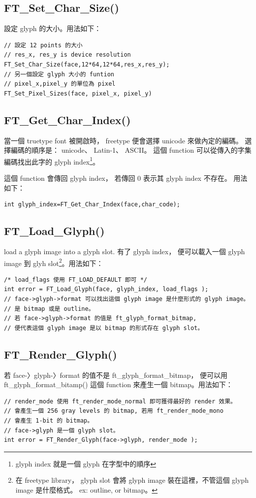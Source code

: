 \documentclass[12pt,a4]{article}
\begin{document}
\begin{CJK}{UTF8}{bsmi}
\subsection{FT\_{}Set\_{}Char\_{}Size()}
設定 glyph 的大小。用法如下：
\begin{Verbatim}[commandchars=@\[\]]
// 設定 12 points 的大小
// res_x, res_y is device resolution
FT_Set_Char_Size(face,12*64,12*64,res_x,res_y);
// 另一個設定 glyph 大小的 funtion
// pixel_x,pixel_y 的單位為 pixel
FT_Set_Pixel_Sizes(face, pixel_x, pixel_y)
\end{Verbatim}
\subsection{FT\_{}Get\_{}Char\_{}Index()}
當一個 truetype font 被開啟時， freetype 便會選擇 unicode 來做內定的編碼。
選擇編碼的順序是： unicode、 Latin-1、 ASCII。
這個 function 可以從傳入的字集編碼找出此字的 glyph index\footnote{glyph index 就是一個 glyph 在字型中的順序}。

這個 function 會傳回 glyph index， 若傳回 0 表示其 glyph index 不存在。 用法如下：
\begin{Verbatim}[commandchars=@\[\]]
int glyph_index=FT_Get_Char_Index(face,char_code);
\end{Verbatim}
\subsection{FT\_{}Load\_{}Glyph()}
load a glyph image into a glyph slot. 有了 glyph index， 便可以載入一個 glyph image 到 glyh slot\footnote{在 freetype library， glyph slot 會將 glyph image 裝在這裡，不管這個 glyph image 是什麼格式。 ex: outline, or bitmap。}。用法如下：
\begin{Verbatim}[commandchars=@\[\]]
/* load_flags 使用 FT_LOAD_DEFAULT 即可 */
int error = FT_Load_Glyph(face, glyph_index, load_flags );  
// face->glyph->format 可以找出這個 glyph image 是什麼形式的 glyph image。
// 是 bitmap 或是 outline。
// 若 face->glyph->format 的值是 ft_glyph_format_bitmap,
// 便代表這個 glyph image 是以 bitmap 的形式存在 glyph slot。
\end{Verbatim}
\subsection{FT\_{}Render\_{}Glyph()}
若 face-〉glyph-〉format 的值不是  ft\_{}glyph\_{}format\_{}bitmap， 便可以用  
ft\_{}glyph\_{}format\_{}bitamp() 這個 function 來產生一個 bitmap。用法如下：
\begin{Verbatim}[commandchars=@\[\]]
// render_mode 使用 ft_render_mode_normal 即可獲得最好的 render 效果。
// 會產生一個 256 gray levels 的 bitmap, 若用 ft_render_mode_mono
// 會產生 1-bit 的 bitmap。
// face->glyph 是一個 glyph slot。
int error = FT_Render_Glyph(face->glyph, render_mode );
\end{Verbatim}
\newpage

\end{CJK}
\end{document}
